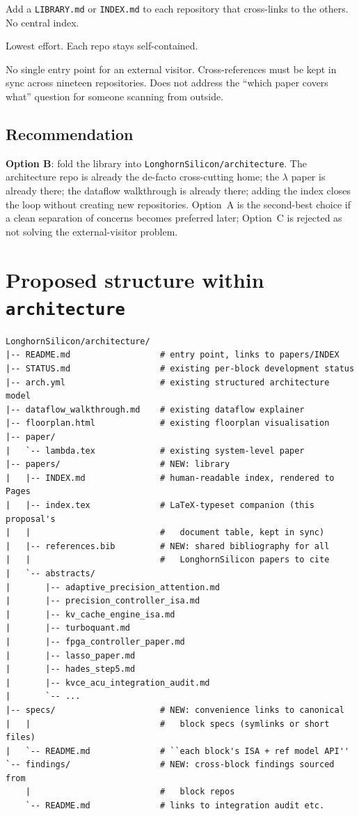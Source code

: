 \documentclass[11pt]{article}
\begin{document}
Add a \texttt{LIBRARY.md} or \texttt{INDEX.md} to each repository
that cross-links to the others. No central index.

\begin{description}[leftmargin=2em,style=nextline]
\item[Pros]
Lowest effort. Each repo stays self-contained.
\item[Cons]
No single entry point for an external visitor. Cross-references must
be kept in sync across nineteen repositories. Does not address the
``which paper covers what'' question for someone scanning from outside.
\end{description}

\subsection{Recommendation}

\textbf{Option B}: fold the library into
\texttt{LonghornSilicon/architecture}. The architecture repo is
already the de-facto cross-cutting home; the $\lambda$ paper is
already there; the dataflow walkthrough is already there; adding the
index closes the loop without creating new repositories. Option~A
is the second-best choice if a clean separation of concerns
becomes preferred later; Option~C is rejected as not solving the
external-visitor problem.

\section{Proposed structure within \texttt{architecture}}

\begin{verbatim}
LonghornSilicon/architecture/
|-- README.md                  # entry point, links to papers/INDEX
|-- STATUS.md                  # existing per-block development status
|-- arch.yml                   # existing structured architecture model
|-- dataflow_walkthrough.md    # existing dataflow explainer
|-- floorplan.html             # existing floorplan visualisation
|-- paper/
|   `-- lambda.tex             # existing system-level paper
|-- papers/                    # NEW: library
|   |-- INDEX.md               # human-readable index, rendered to Pages
|   |-- index.tex              # LaTeX-typeset companion (this proposal's
|   |                          #   document table, kept in sync)
|   |-- references.bib         # NEW: shared bibliography for all
|   |                          #   LonghornSilicon papers to cite
|   `-- abstracts/
|       |-- adaptive_precision_attention.md
|       |-- precision_controller_isa.md
|       |-- kv_cache_engine_isa.md
|       |-- turboquant.md
|       |-- fpga_controller_paper.md
|       |-- lasso_paper.md
|       |-- hades_step5.md
|       |-- kvce_acu_integration_audit.md
|       `-- ...
|-- specs/                     # NEW: convenience links to canonical
|   |                          #   block specs (symlinks or short files)
|   `-- README.md              # ``each block's ISA + ref model API''
`-- findings/                  # NEW: cross-block findings sourced from
    |                          #   block repos
    `-- README.md              # links to integration audit etc.
\end{verbatim}
\end{document}
